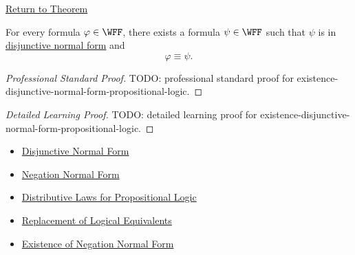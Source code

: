 \newpage
{}
\label{prf:existence-disjunctive-normal-form-propositional-logic}

\begin{remark*}[Return]
\hyperref[thm:existence-disjunctive-normal-form-propositional-logic]{Return to Theorem}
\end{remark*}

\begin{theorem*}
For every formula \(\varphi\in\WFF\), there exists a formula
\(\psi\in\WFF\) such that \(\psi\) is in
\hyperref[def:disjunctive-normal-form-propositional-logic]{disjunctive normal form}
and
\[
\varphi\equiv\psi.
\]
\end{theorem*}

\begin{proof}[Professional Standard Proof]
\LRAProofBodyStart
TODO: professional standard proof for existence-disjunctive-normal-form-propositional-logic.
\end{proof}

\begin{proof}[Detailed Learning Proof]
\LRAProofBodyStart
TODO: detailed learning proof for existence-disjunctive-normal-form-propositional-logic.
\end{proof}

\begin{remark*}
\end{remark*}

\begin{dependencies}
\begin{itemize}
  \item \hyperref[def:disjunctive-normal-form-propositional-logic]{Disjunctive Normal Form}
  \item \hyperref[def:negation-normal-form-propositional-logic]{Negation Normal Form}
  \item \hyperref[thm:distributive-laws-propositional-logic]{Distributive Laws for Propositional Logic}
  \item \hyperref[thm:replacement-of-logical-equivalents-propositional-logic]{Replacement of Logical Equivalents}
  \item \hyperref[thm:existence-negation-normal-form-propositional-logic]{Existence of Negation Normal Form}
\end{itemize}
\end{dependencies}

\clearpage
